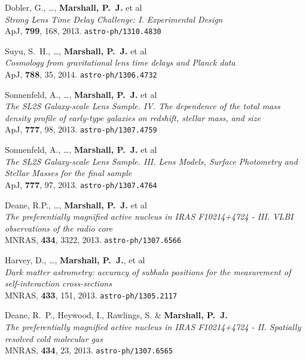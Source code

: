 \begin{revnumerate}
\item{{Dobler}, G., \ldots, \textbf{Marshall, P.~J.} et al\\
\textit{Strong Lens Time Delay Challenge: I. Experimental Design}\\
ApJ, \textbf{799}, 168, 2013.
\texttt{astro-ph/1310.4830}
}

\item{{Suyu}, S.~H., \ldots, \textbf{{Marshall}, P.~J.} et al\\
\textit{Cosmology from gravitational lens time delays and Planck data}\\
ApJ, \textbf{788}, 35, 2014.
\texttt{astro-ph/1306.4732}
}

\item{{Sonnenfeld}, A., \ldots, \textbf{{Marshall}, P.~J.} et al\\
\textit{The SL2S Galaxy-scale Lens Sample. IV. The dependence of the total mass density profile of early-type galaxies on redshift, stellar mass, and size}\\
ApJ, \textbf{777}, 98, 2013.
\texttt{astro-ph/1307.4759}
}

\item{{Sonnenfeld}, A., \ldots, \textbf{{Marshall}, P.~J.} et al\\
\textit{The SL2S Galaxy-scale Lens Sample. III. Lens Models, Surface Photometry and Stellar Masses for the final sample}\\
ApJ, \textbf{777}, 97, 2013.
\texttt{astro-ph/1307.4764}
}

\item{{Deane}, R.P., \ldots, \textbf{{Marshall}, P.~J.} et al\\
\textit{The preferentially magnified active nucleus in IRAS F10214+4724 - III. VLBI observations of the radio core}\\
MNRAS, \textbf{434}, 3322, 2013.
\texttt{astro-ph/1307.6566}
}

\item{Harvey, D., \ldots, \textbf{Marshall, P.~J.}, et al\\
\textit{Dark matter astrometry: accuracy of subhalo positions for the measurement of self-interaction cross-sections}\\
MNRAS, \textbf{433}, 151, 2013.
\texttt{astro-ph/1305.2117}
}

\item{Deane, R.~P., Heywood, I., Rawlings, S. \& \textbf{Marshall, P.~J.}\\
\textit{The preferentially magnified active nucleus in IRAS F10214+4724 - II. Spatially resolved cold molecular gas}\\
MNRAS, \textbf{434}, 23, 2013.
\texttt{astro-ph/1307.6565}
}


\end{revnumerate}
